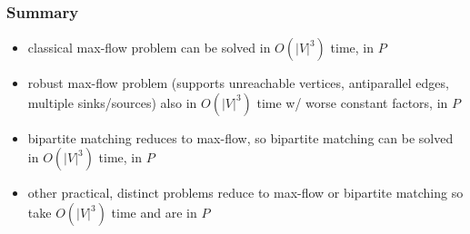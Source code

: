 \documentclass[10pt,aspectratio=169]{beamer}
\begin{document}
\begin{frame} \frametitle{Summary}
  \begin{itemize}
    \item classical max-flow problem can be solved in $O(|V|^3)$ time, in $P$
    \item robust max-flow problem (supports unreachable vertices, antiparallel edges, multiple sinks/sources)
      also in $O(|V|^3)$ time w/ worse constant factors, in $P$
    \item bipartite matching reduces to max-flow, so bipartite matching can be solved in
      $O(|V|^3)$ time, in $P$
    \item other practical, distinct problems reduce to max-flow or bipartite
      matching so take $O(|V|^3)$ time and are in $P$
  \end{itemize}
\end{frame}
\end{document}
